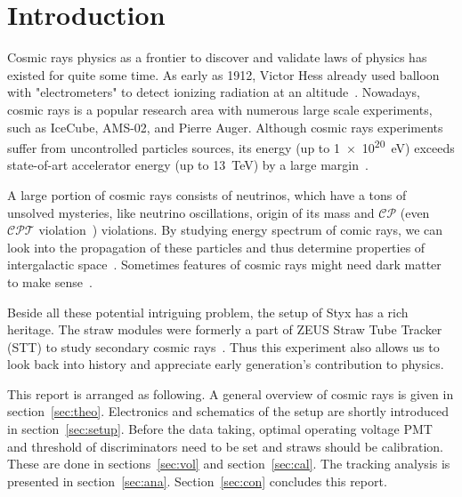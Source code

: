 \begin{abstract}
	In this experiment, we learnt about basic nuclear electronic, gas detectors, and tracking system of charged cosmic radiation. The goal of the experiment is to obtain the angular distribution of atmospheric muons. To do so, we determined and set up the operation voltage \SI{2150}{\volt} for PMT and \SI{2.0}{\volt} as threshold voltage. In the end, we found that the muon angular distribution deviate quite significantly away from theoretical $\cos^2 \theta$ curve.
\end{abstract}

\section{Introduction}
Cosmic rays physics as a frontier to discover and validate laws of physics has existed for quite some time. As early as 1912, Victor Hess already used balloon with "electrometers" to detect ionizing radiation at an altitude~\cite{wiki:cosmic}. Nowadays, cosmic rays is a popular research area with numerous large scale experiments, such as IceCube, AMS-02, and Pierre Auger. Although cosmic rays experiments suffer from uncontrolled particles sources, its energy (up to \SI{1e20}{\eV}) exceeds state-of-art accelerator energy (up to \SI{13}{\tera\eV}) by a large margin~\cite{Gaisser}. 

A large portion of cosmic rays consists of neutrinos, which have a tons of unsolved mysteries, like neutrino oscillations, origin of its mass and $\mathcal{CP}$ (even $\mathcal{CPT}$ violation~\cite{Barenboim_2017}) violations. By studying energy spectrum of comic rays, we can look into the propagation of these particles and thus determine properties of intergalactic space~\cite{Gaisser}. Sometimes features of cosmic rays might need dark matter to make sense~\cite{grupen}\cite{Gomez_Coral_2020}.

Beside all these potential intriguing problem, the setup of Styx has a rich heritage. The straw modules were formerly a part of ZEUS Straw Tube Tracker (STT) to study secondary cosmic rays~\cite{Styx}. Thus this experiment also allows us to look back into history and appreciate early generation's contribution to physics.

This report is arranged as following. A general overview of cosmic rays is given in section~\ref{sec:theo}. Electronics and schematics of the setup are shortly introduced in section~\ref{sec:setup}. Before the data taking, optimal operating voltage PMT and threshold of discriminators need to be set and straws should be calibration. These are done in sections~\ref{sec:vol} and section~\ref{sec:cal}. The tracking analysis is presented in section~\ref{sec:ana}. Section~\ref{sec:con} concludes this report.
